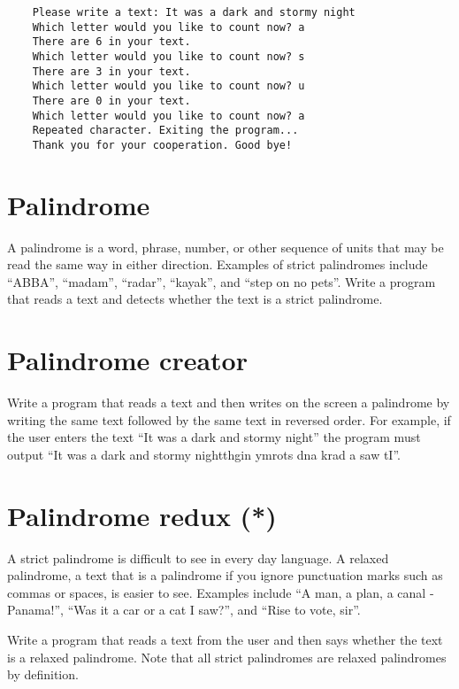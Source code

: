 \documentclass{article}
\begin{document}
\begin{verbatim}
    Please write a text: It was a dark and stormy night
    Which letter would you like to count now? a
    There are 6 in your text. 
    Which letter would you like to count now? s
    There are 3 in your text. 
    Which letter would you like to count now? u
    There are 0 in your text. 
    Which letter would you like to count now? a
    Repeated character. Exiting the program...
    Thank you for your cooperation. Good bye!
\end{verbatim}

\section{Palindrome}
\label{sec:palindrome}

A palindrome is a word, phrase, number, or other sequence of units
that may be read the same way in either direction. Examples of strict
palindromes include ``ABBA'', ``madam'', ``radar'', ``kayak'', and
``step on no pets''. Write a program
that reads a text and detects whether the text is a strict palindrome.

\section{Palindrome creator}
\label{sec:palindrome-creator}

Write a program that reads a text and then writes on the screen a
palindrome by writing the same text followed by the same text in
reversed order. For example, if the user enters the text ``It was a
dark and stormy night'' the program must output ``It was a dark and
stormy nightthgin ymrots dna krad a saw tI''. 

\section{Palindrome redux (*)}
\label{sec:palindrome-redux}

A strict palindrome is difficult to see in every day language. A
relaxed palindrome, a text that is a palindrome if you ignore
punctuation marks such as commas or spaces, is easier to see. Examples
include ``A man, a plan, a canal - Panama!'', ``Was it a car or a cat
I saw?'', and ``Rise to vote, sir''. 

Write a program that reads a text from the user and then says whether
the text is a relaxed palindrome. Note that all strict palindromes are
relaxed palindromes by definition. 
\end{document}
